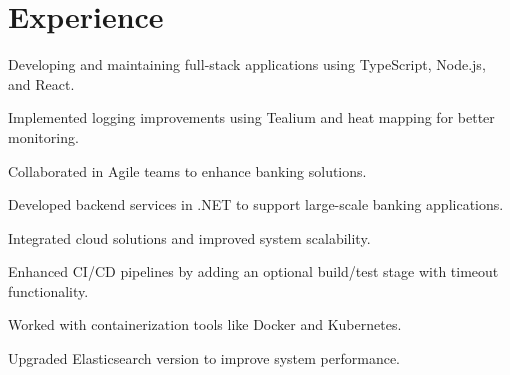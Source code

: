 \documentclass[]{deedy-resume-reversed}
\begin{document}


\begin{minipage}[t]{0.60\textwidth}


\section{Experience}
\begin{tightemize}
\item Developing and maintaining full-stack applications using TypeScript, Node.js, and React.
\item Implemented logging improvements using Tealium and heat mapping for better monitoring.
\item Collaborated in Agile teams to enhance banking solutions.
\end{tightemize}
\sectionsep

\begin{tightemize}
\item Developed backend services in .NET to support large-scale banking applications.
\item Integrated cloud solutions and improved system scalability.
\end{tightemize}
\sectionsep

\begin{tightemize}
\item Enhanced CI/CD pipelines by adding an optional build/test stage with timeout functionality.
\item Worked with containerization tools like Docker and Kubernetes.
\end{tightemize}
\sectionsep

\begin{tightemize}
\item Upgraded Elasticsearch version to improve system performance.
\end{tightemize}
\sectionsep


\end{minipage}
\end{document}
